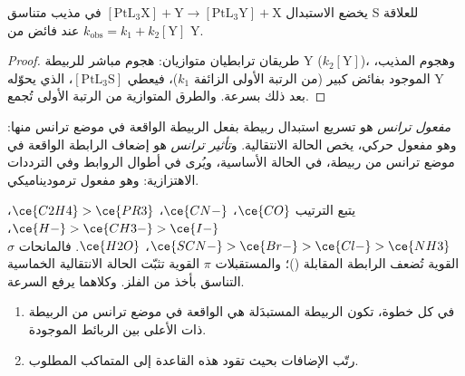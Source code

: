 \begin{proposition}\label{prop:b3:complex-mechanisms:square-planar}
يخضع الاستبدال $\mathrm{[PtL_3X] + Y \to [PtL_3Y] + X}$ في مذيب متناسق S
للعلاقة $k_{\mathrm{obs}} = k_1 + k_2[\mathrm Y]$ عند فائض من Y.
\end{proposition}

\begin{proof}
طريقان ترابطيان متوازيان: هجوم مباشر للربيطة Y ($k_2[\mathrm Y]$)، وهجوم
المذيب، الموجود بفائض كبير (من الرتبة الأولى الزائفة $k_1$)، فيعطي $[\mathrm{PtL_3S}]$، الذي
يحوّله Y بعد ذلك بسرعة. والطرق المتوازية من الرتبة الأولى تُجمع.
\end{proof}

\begin{definition}\label{def:b3:complex-mechanisms:trans-effect}
\emph{مفعول ترانس} هو تسريع استبدال
ربيطة بفعل الربيطة الواقعة في موضع ترانس منها: وهو مفعول حركي، يخص الحالة الانتقالية.
و\emph{تأثير ترانس} هو إضعاف الرابطة الواقعة في موضع ترانس من ربيطة، في الحالة
الأساسية، ويُرى في أطوال الروابط وفي الترددات
الاهتزازية: وهو مفعول ترموديناميكي.
\end{definition}

يتبع  الترتيب $\ce{CO}$، $\ce{CN-}$، $\ce{C2H4} > \ce{PR3}$، $\ce{H-} > \ce{CH3-} > \ce{I-}$، $\ce{SCN-} >
\ce{Br-} > \ce{Cl-} > \ce{NH3}$، $\ce{H2O}$. فالمانحات $\sigma$ القوية تُضعف الرابطة المقابلة ()؛
والمستقبلات $\pi$ القوية تثبّت الحالة الانتقالية الخماسية التناسق بأخذ
 من الفلز. وكلاهما يرفع السرعة.

\begin{method}\label{met:b3:complex-mechanisms:pt-synthesis}
\begin{enumerate}
  \item في كل خطوة، تكون الربيطة المستبدَلة هي الواقعة في موضع ترانس من الربيطة
        ذات  الأعلى بين الربائط الموجودة.
  \item رتّب الإضافات بحيث تقود هذه القاعدة إلى المتماكب المطلوب.
\end{enumerate}
\end{method}

